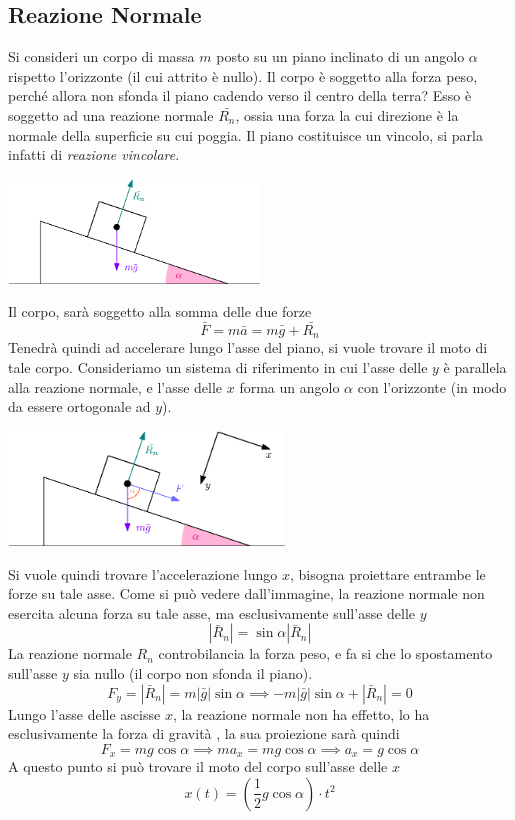 \documentclass[10pt, letterpaper]{report}
\begin{document}
\subsection{Reazione Normale}
Si consideri un corpo di massa $m$ posto su un piano inclinato di un angolo $\alpha$ rispetto 
l'orizzonte (il cui attrito è nullo). Il corpo è soggetto alla forza peso, perché allora non sfonda il piano cadendo verso il 
centro della terra? Esso è soggetto ad una reazione normale $\bar{R_n}$, ossia una forza la cui direzione è la normale 
della superficie su cui poggia. Il piano costituisce un vincolo, si parla infatti di \textit{reazione vincolare}.
\begin{center}
    \includegraphics[width=0.5\textwidth]{images/reazionenormale.eps}
\end{center}
Il corpo, sarà soggetto alla somma delle due forze 
$$ \bar F = m\bar a = m\bar g + \bar{R_n}$$
Tenedrà quindi ad accelerare lungo l'asse del piano, si vuole trovare il moto di tale corpo. Consideriamo un 
sistema di riferimento in cui l'asse delle $y$ è parallela alla reazione normale, e l'asse delle $x$ 
forma un angolo $\alpha$ con l'orizzonte (in modo da essere ortogonale ad $y$).
\begin{center}
    \includegraphics[width=0.55\textwidth]{images/reazionenormale2.eps}
\end{center}
Si vuole quindi trovare l'accelerazione lungo $x$, bisogna proiettare entrambe le forze su tale asse. 
Come si può vedere dall'immagine, la reazione normale non esercita alcuna forza su tale asse, ma esclusivamente sull'asse 
delle $y$ 
$$ |\bar R_n|=\sin\alpha|\bar R_n| $$
La reazione normale $R_n$ controbilancia la forza peso, e fa si che lo spostamento sull'asse $y$ sia nullo (il corpo non sfonda il piano). 
$$ F_y=
|\bar R_n|=m|\bar g|\sin \alpha \implies
-m|\bar g|\sin \alpha +|\bar R_n|=0$$
Lungo l'asse delle ascisse $x$, la reazione normale non ha effetto, lo ha esclusivamente la forza di gravità , la sua proiezione sarà quindi
$$ F_x=mg\cos\alpha\implies ma_x=mg\cos\alpha\implies a_x=g\cos\alpha$$
A questo punto si può trovare il moto del corpo sull'asse delle $x$
$$ x(t)=(\frac{1}{2}g\cos\alpha)\cdot t^2$$
\end{document}
